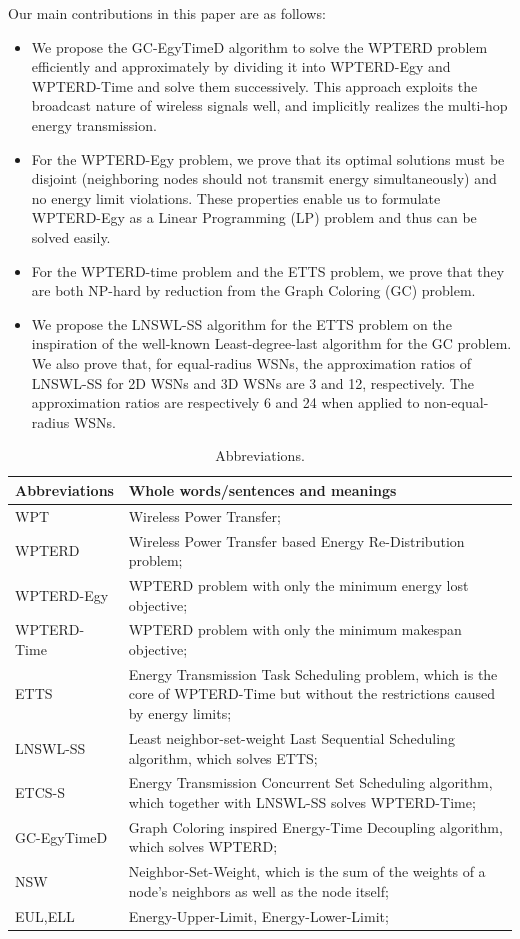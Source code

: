 \documentclass[journal,10pt]{IEEEtran}
\begin{document}
Our main contributions in this paper are as follows:

\begin{itemize}
\item{We propose the GC-EgyTimeD algorithm to solve the WPTERD problem efficiently and approximately by dividing it into WPTERD-Egy and WPTERD-Time and solve them successively. This approach exploits the broadcast nature of wireless signals well, and implicitly realizes the multi-hop energy transmission.}
\item{For the WPTERD-Egy problem, we prove that its optimal solutions must be disjoint (neighboring nodes should not transmit energy simultaneously) and no energy limit violations. These properties enable us to formulate WPTERD-Egy as a Linear Programming (LP) problem and thus can be solved easily.}
\item{For the WPTERD-time problem and the ETTS problem, we prove that they are both NP-hard by reduction from the Graph Coloring (GC) problem.}
\item{We propose the LNSWL-SS algorithm for the ETTS problem on the inspiration of the well-known Least-degree-last algorithm for the GC problem. We also prove that, for equal-radius WSNs, the approximation ratios of LNSWL-SS for 2D WSNs and 3D WSNs are 3 and 12, respectively. The approximation ratios are respectively 6 and 24 when applied to non-equal-radius WSNs.}
\end{itemize}


\begin{table}[!htbp]
\caption{Abbreviations.}
\centering
\label{T0}
\footnotesize{
\begin{tabular}
{|p{}|p{}|}
\hline
\hline
\textbf{Abbreviations} & Whole words/sentences and meanings\\
\hline
\hline
WPT & Wireless Power Transfer;\\
\hline
WPTERD & Wireless Power Transfer based Energy Re-Distribution problem;\\
\hline
WPTERD-Egy & WPTERD problem with only the minimum energy lost objective;\\
\hline
WPTERD-Time & WPTERD problem with only the minimum makespan objective;\\
\hline
ETTS & Energy Transmission Task Scheduling problem, which is the core of WPTERD-Time but without the restrictions caused by energy limits;\\
\hline
LNSWL-SS & Least neighbor-set-weight Last Sequential Scheduling algorithm, which solves ETTS;\\
\hline
ETCS-S & Energy Transmission Concurrent Set Scheduling algorithm, which together with LNSWL-SS solves WPTERD-Time;\\
\hline
GC-EgyTimeD & Graph Coloring inspired Energy-Time Decoupling algorithm, which solves WPTERD;\\
\hline
NSW & Neighbor-Set-Weight, which is the sum of the weights of a node's neighbors as well as the node itself;\\
\hline
EUL,ELL & Energy-Upper-Limit, Energy-Lower-Limit;\\
\hline
\hline
\end{tabular}
}
\end{table}
\end{document}
